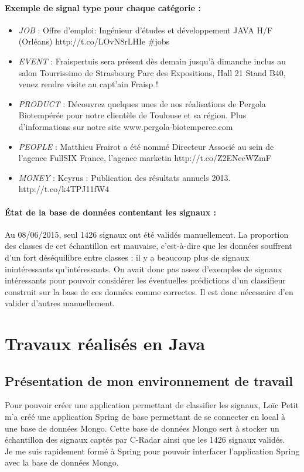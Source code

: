     \paragraph{Exemple de signal type pour chaque catégorie :}
        \begin{itemize}
            \item \textit{JOB} : \og Offre d'emploi: Ingénieur d'études et développement JAVA H/F (Orléans) http://t.co/LOvN8rLHIe \#jobs \fg
            \item \textit{EVENT} : \og  Fraispertuis sera présent dès demain jusqu'à dimanche inclus au salon \og Tourrissimo \fg de Strasbourg Parc des Expositions, Hall 21 Stand B40, venez rendre visite au capt'ain Fraisp ! \fg
            \item \textit{PRODUCT} : \og Découvrez quelques unes de nos réalisations de Pergola Biotempérée pour notre clientèle de Toulouse et sa région. Plus d'informations sur notre site www.pergola-biotemperee.com \fg
            \item \textit{PEOPLE} : \og Matthieu Frairot a été nommé Directeur Associé au sein de l'agence FullSIX France, l'agence marketin http://t.co/Z2ENeeWZmF \fg
            \item \textit{MONEY} : \og Keyrus : Publication des résultats annuels 2013. http://t.co/k4TPJ11fW4 \fg
        \end{itemize}

    \paragraph{État de la base de données contentant les signaux :}
        Au 08/06/2015, seul 1426 signaux ont été validés manuellement.
        La proportion des classes de cet échantillon est mauvaise, c'est-à-dire que les données souffrent d'un fort déséquilibre entre classes : il y a beaucoup plus de signaux inintéressants qu'intéressants. On avait donc pas assez d'exemples de signaux intéressants pour pouvoir considérer les éventuelles prédictions d'un classifieur construit sur la base de ces données comme correctes. Il est donc nécessaire d'en valider d'autres manuellement.

\section{Travaux réalisés en Java}
\label{sec:travaux_realises_en_java}
    \subsection{Présentation de mon environnement de travail}
        Pour pouvoir créer une application permettant de classifier les signaux, Loïc Petit m'a créé une application Spring de base permettant de se connecter en local à une base de données Mongo. Cette base de données Mongo sert à stocker un échantillon des signaux captés par C-Radar ainsi que les 1426 signaux validés.\\
        Je me suis rapidement formé à Spring pour pouvoir interfacer l'application Spring avec la base de données Mongo.\\

